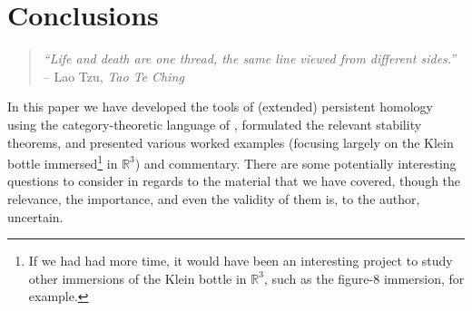 \documentclass[12pt]{article}
\numberwithin{equation}{subsection}
\numberwithin{theorem}{subsection}
\numberwithin{lemma}{subsection}
\numberwithin{corollary}{subsection}
\numberwithin{definition}{subsection}
\numberwithin{example}{subsection}
\numberwithin{note}{subsection}
\newcommand{\rr}{\mathbb{R}}
\begin{document}














    \section{Conclusions} %
    \label{sec:conclusions}

        \begin{quotation}
            \raggedleft
            \emph{``Life and death are one thread, the same line viewed from different sides.''}\\
            -- Lao Tzu, \emph{Tao Te Ching}
        \end{quotation}

        In this paper we have developed the tools of (extended) persistent homology using the category-theoretic language of \cite{Bubenik:dn}, formulated the relevant stability theorems, and presented various worked examples (focusing largely on the Klein bottle immersed\footnote{
            If we had had more time, it would have been an interesting project to study other immersions of the Klein bottle in $\rr^3$, such as the figure-8 immersion, for example.
        } in $\rr^3$) and commentary.
        There are some potentially interesting questions to consider in regards to the material that we have covered, though the relevance, the importance, and even the validity of them is, to the author, uncertain.
\end{document}
